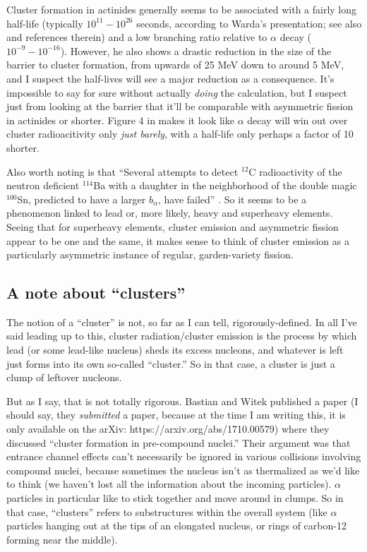 Cluster formation in actinides generally seems to be associated with a fairly long half-life (typically $10^{11}-10^{26}$ seconds, according to Warda's presentation; see also \cite{Poenaru2011} and references therein) and a low branching ratio relative to $\alpha$ decay ($10^{-9}-10^{-16}$). However, he also shows a drastic reduction in the size of the barrier to cluster formation, from upwards of 25 MeV down to around 5 MeV, and I suspect the half-lives will see a major reduction as a consequence. It's impossible to say for sure without actually \textit{doing} the calculation, but I suspect just from looking at the barrier that it'll be comparable with asymmetric fission in actinides or shorter. Figure 4 in \cite{Poenaru2011} makes it look like $\alpha$ decay will win out over cluster radioacitivity only \textit{just barely}, with a half-life only perhaps a factor of 10 shorter.

Also worth noting is that ``Several attempts to detect $^{12}$C radioactivity of the neutron deficient $^{114}$Ba
with a daughter in the neighborhood of the double magic $^{100}$Sn, predicted to have a larger $b_\alpha$, have failed'' \cite{Poenaru2011}. So it seems to be a phenomenon linked to lead or, more likely, heavy and superheavy elements. Seeing that for superheavy elements, cluster emission and asymmetric fission appear to be one and the same, it makes sense to think of cluster emission as a particularly asymmetric instance of regular, garden-variety fission.

\subsection*{A note about ``clusters''}
The notion of a ``cluster'' is not, so far as I can tell, rigorously-defined. In all I've said leading up to this, cluster radiation/cluster emission is the process by which lead (or some lead-like nucleus) sheds its excess nucleons, and whatever is left just forms into its own so-called ``cluster.'' So in that case, a cluster is just a clump of leftover nucleons.

But as I say, that is not totally rigorous. Bastian and Witek published a paper (I should say, they \textit{submitted} a paper, because at the time I am writing this, it is only available on the arXiv: https://arxiv.org/abs/1710.00579) where they discussed ``cluster formation in pre-compound nuclei.'' Their argument was that entrance channel effects can't necessarily be ignored in various collisions involving compound nuclei, because sometimes the nucleus isn't as thermalized as we'd like to think (we haven't lost all the information about the incoming particles). $\alpha$ particles in particular like to stick together and move around in clumps. So in that case, ``clusters'' refers to substructures within the overall system (like $\alpha$ particles hanging out at the tips of an elongated nucleus, or rings of carbon-12 forming near the middle).

